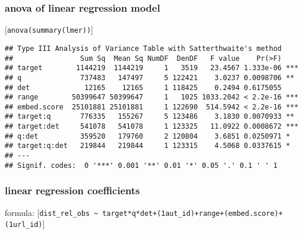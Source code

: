 \documentclass[
  12pt,
  oneside]{book}
\begin{document}
\subsubsection{anova of linear regression model}\label{anova-of-linear-regression-model}

{[}\texttt{anova(summary(lmer))}{]}

\begin{verbatim}
## Type III Analysis of Variance Table with Satterthwaite's method
##                Sum Sq  Mean Sq NumDF  DenDF   F value    Pr(>F)    
## target        1144219  1144219     1   3519   23.4567 1.333e-06 ***
## q              737483   147497     5 122421    3.0237 0.0098706 ** 
## det             12165    12165     1 118425    0.2494 0.6175055    
## range        50399647 50399647     1   1025 1033.2042 < 2.2e-16 ***
## embed.score  25101881 25101881     1 122690  514.5942 < 2.2e-16 ***
## target:q       776335   155267     5 123486    3.1830 0.0070933 ** 
## target:det     541078   541078     1 123325   11.0922 0.0008672 ***
## q:det          359520   179760     2 120804    3.6851 0.0250971 *  
## target:q:det   219844   219844     1 123315    4.5068 0.0337615 *  
## ---
## Signif. codes:  0 '***' 0.001 '**' 0.01 '*' 0.05 '.' 0.1 ' ' 1
\end{verbatim}

\subsubsection{linear regression coefficients}\label{linear-regression-coefficients}

formula: {[}\texttt{dist\_rel\_obs\ \textasciitilde{}\ target*q*det+(1\textbar{}aut\_id)+range+(embed.score)+(1\textbar{}url\_id)}{]}
\end{document}
